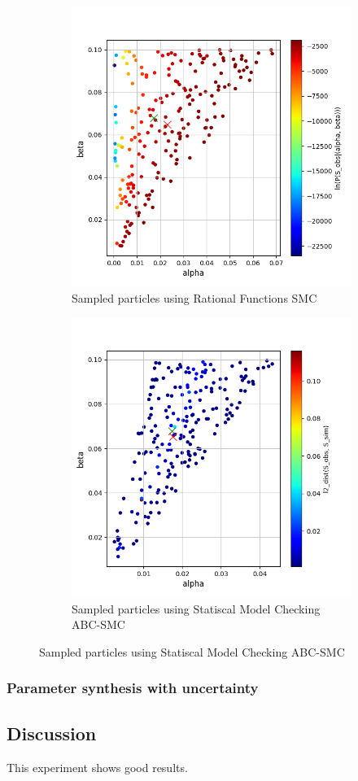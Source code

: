 \begin{figure}[!htb]
    \centering
    \begin{subfigure}{0.48\textwidth}
        \centering
        \includegraphics[width=\linewidth]{figures/sir510_rfsmc.png}
        \caption{Sampled particles using Rational Functions SMC}
    \end{subfigure}
    \hfill
    \begin{subfigure}{0.48\textwidth}
        \centering
        \includegraphics[width=\linewidth]{figures/sir510_abcsmc.png}
        \caption{Sampled particles using Statiscal Model Checking ABC-SMC}
    \end{subfigure}
\end{figure}

\subsubsection{Parameter synthesis with uncertainty}

\subsection{Discussion}
This experiment shows good results.
